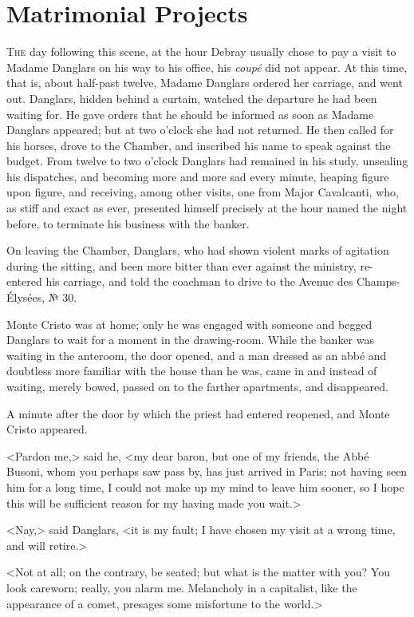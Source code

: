 \chapter{Matrimonial Projects} 

 \lettrine{T}{he} day following this scene, at the hour Debray usually chose to pay a visit to Madame Danglars on his way to his office, his \textit{coupé} did not appear. At this time, that is, about half-past twelve, Madame Danglars ordered her carriage, and went out. Danglars, hidden behind a curtain, watched the departure he had been waiting for. He gave orders that he should be informed as soon as Madame Danglars appeared; but at two o'clock she had not returned. He then called for his horses, drove to the Chamber, and inscribed his name to speak against the budget. From twelve to two o'clock Danglars had remained in his study, unsealing his dispatches, and becoming more and more sad every minute, heaping figure upon figure, and receiving, among other visits, one from Major Cavalcanti, who, as stiff and exact as ever, presented himself precisely at the hour named the night before, to terminate his business with the banker. 

 On leaving the Chamber, Danglars, who had shown violent marks of agitation during the sitting, and been more bitter than ever against the ministry, re-entered his carriage, and told the coachman to drive to the Avenue des Champs-Élysées, № 30. 

 Monte Cristo was at home; only he was engaged with someone and begged Danglars to wait for a moment in the drawing-room. While the banker was waiting in the anteroom, the door opened, and a man dressed as an abbé and doubtless more familiar with the house than he was, came in and instead of waiting, merely bowed, passed on to the farther apartments, and disappeared. 

 A minute after the door by which the priest had entered reopened, and Monte Cristo appeared. 

 <Pardon me,> said he, <my dear baron, but one of my friends, the Abbé Busoni, whom you perhaps saw pass by, has just arrived in Paris; not having seen him for a long time, I could not make up my mind to leave him sooner, so I hope this will be sufficient reason for my having made you wait.> 

 <Nay,> said Danglars, <it is my fault; I have chosen my visit at a wrong time, and will retire.> 

 <Not at all; on the contrary, be seated; but what is the matter with you? You look careworn; really, you alarm me. Melancholy in a capitalist, like the appearance of a comet, presages some misfortune to the world.> 

